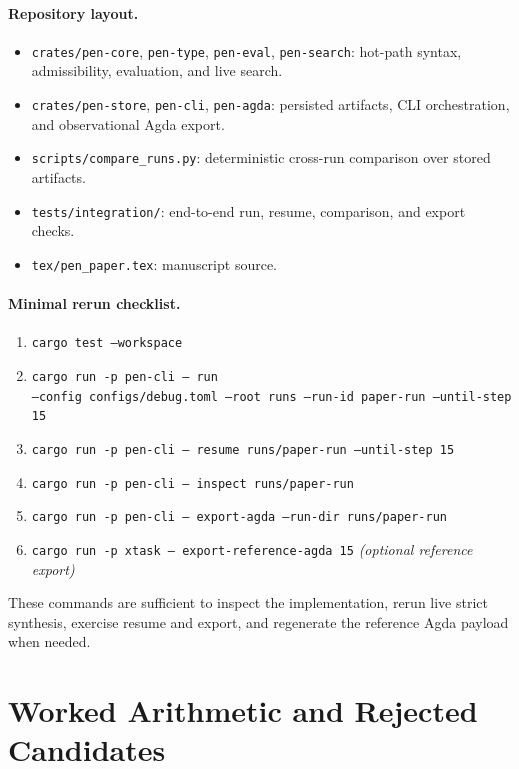 \documentclass[11pt,a4paper]{article}
\theoremstyle{plain}
\theoremstyle{definition}
\theoremstyle{remark}
\begin{document}
\paragraph{Repository layout.}
\begin{itemize}[nosep]
    \item \texttt{crates/pen-core}, \texttt{pen-type}, \texttt{pen-eval}, \texttt{pen-search}: hot-path syntax, admissibility, evaluation, and live search.
    \item \texttt{crates/pen-store}, \texttt{pen-cli}, \texttt{pen-agda}: persisted artifacts, CLI orchestration, and observational Agda export.
    \item \texttt{scripts/compare\_runs.py}: deterministic cross-run comparison over stored artifacts.
    \item \texttt{tests/integration/}: end-to-end run, resume, comparison, and export checks.
    \item \texttt{tex/pen\_paper.tex}: manuscript source.
\end{itemize}

\paragraph{Minimal rerun checklist.}
\begin{enumerate}[nosep]
    \item \texttt{cargo test --workspace}
    \item \texttt{cargo run -p pen-cli -- run}\\
    \texttt{--config configs/debug.toml --root runs --run-id paper-run --until-step 15}
    \item \texttt{cargo run -p pen-cli -- resume runs/paper-run --until-step 15}
    \item \texttt{cargo run -p pen-cli -- inspect runs/paper-run}
    \item \texttt{cargo run -p pen-cli -- export-agda --run-dir runs/paper-run}
    \item \texttt{cargo run -p xtask -- export-reference-agda 15} \textit{(optional reference export)}
\end{enumerate}
These commands are sufficient to inspect the implementation, rerun live strict synthesis, exercise resume and export, and regenerate the reference Agda payload when needed.

\section{Worked Arithmetic and Rejected Candidates}
\label{app:rejections}
\end{document}
